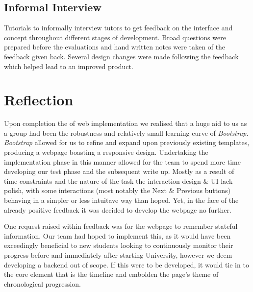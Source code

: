 \documentclass[a4paper, notoc]{tufte-handout}
\begin{document}
\subsection{Informal Interview}\label{subsec:interview}


Tutorials to informally interview tutors to get feedback on the interface and concept throughout 
different stages of development. Broad questions were prepared before the evaluations and hand 
written notes were taken of the feedback given back. Several design changes were made following 
the feedback which helped lead to an improved product.

\section{Reflection}


Upon completion the of web implementation we realised that a huge aid to us as a group had been 
the robustness and relatively small learning curve of \textit{Bootstrap}. \textit{Bootstrap} 
allowed for us to refine and expand upon previously existing templates, producing a webpage 
boasting a responsive design. Undertaking the implementation phase in this manner allowed for 
the team to spend more time developing our test phase and the subsequent write up. Mostly as 
a result of time-constraints and the nature of the task the interaction design \& UI lack 
polish, with some interactions (most notably the Next \& Previous buttons) behaving in a simpler 
or less intuitave way than hoped. Yet, in the face of the already positive feedback it was 
decided to develop the webpage no further.

One request raised within feedback was for the webpage to remember stateful information. Our 
team had hoped to implement this, as it would have been exceedingly beneficial to new students 
looking to continuously monitor their progress before and immediately after starting University, 
however we deem developing a backend out of scope. If this were to be developed, it would tie 
in to the core element that is the timeline and embolden the page's theme of chronological progression.
\end{document}
